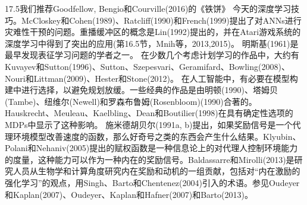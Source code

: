 17.5我们推荐Goodfellow, Bengio和Courville(2016)的《铁饼》
今天的深度学习技巧。McCloskey和Cohen(1989)、Ratcliff(1990)和French(1999)提出了对ANNs进行灾难性干预的问题。重播缓冲区的概念是Lin(1992)提出的，并在Atari游戏系统的深度学习中得到了突出的应用(第16.5节，Mnih等，2013,2015)。
明斯基(1961)是最早发现表征学习问题的学者之一。
在少数几个考虑计划学习的作品中，大约有Kuvayev和Sutton(1996)、Sutton、Szepesvari、Geramifard、Bowling(2008)、Nouri和Littman(2009)、Hester和Stone(2012)。
在人工智能中，有必要在模型构建中进行选择，以避免规划放缓。一些经典的作品是由明顿(1990)、塔姆贝(Tambe)、纽维尔(Newell)和罗森布鲁姆(Rosenbloom)(1990)合著的。Hauskrecht、Meuleau、Kaelbling、Dean和Boutilier(1998)在具有确定性选项的MDPs中显示了这种影响。
施米德胡贝尔(1991a, b)提出，如果奖励信号是一个代理环境模型改善速度的函数，那么好奇号之类的东西会产生什么结果。Klyubin、Polani和Nehaniv(2005)提出的赋权函数是一种信息论上的对代理人控制环境能力的度量，这种能力可以作为一种内在的奖励信号。Baldassarre和Mirolli(2013)是研究人员从生物学和计算角度研究内在奖励和动机的一组贡献，包括对“内在激励的强化学习”的观点，用Singh、Barto和Chentenez(2004)引入的术语。参见Oudeyer和Kaplan(2007)、Oudeyer、Kaplan和Hafner(2007)和Barto(2013)。

